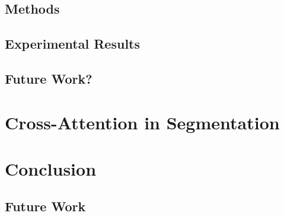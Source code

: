 \documentclass[a4paper,12pt]{report}
\begin{document}

\section{Methods}

\section{Experimental Results}

\section{Future Work?}

\chapter{Cross-Attention in Segmentation}


\FloatBarrier


\chapter{Conclusion}
\section{Future Work}


{}

\end{document}
